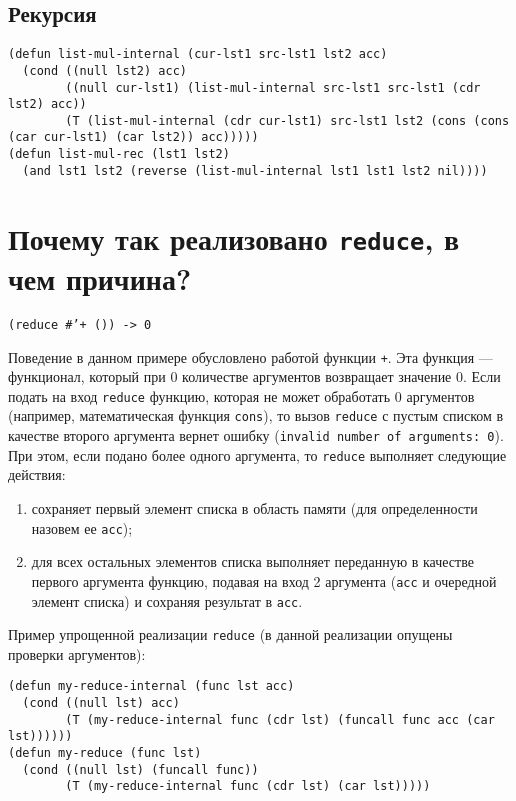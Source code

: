 \subsection{Рекурсия}
\begin{lstlisting}
(defun list-mul-internal (cur-lst1 src-lst1 lst2 acc)
  (cond ((null lst2) acc)
        ((null cur-lst1) (list-mul-internal src-lst1 src-lst1 (cdr lst2) acc))
        (T (list-mul-internal (cdr cur-lst1) src-lst1 lst2 (cons (cons (car cur-lst1) (car lst2)) acc)))))
(defun list-mul-rec (lst1 lst2)
  (and lst1 lst2 (reverse (list-mul-internal lst1 lst1 lst2 nil))))
\end{lstlisting}


\section{Почему так реализовано \texttt{reduce}, в чем причина?}

\texttt{(reduce \#'+ ()) -> 0}

Поведение в данном примере обусловлено работой функции \texttt{+}. Эта функция --- функционал, который при 0 количестве аргументов возвращает значение 0. Если подать на вход \texttt{reduce} функцию, которая не может обработать 0 аргументов (например, математическая функция \texttt{cons}), то вызов \texttt{reduce} с пустым списком в качестве второго аргумента вернет ошибку (\texttt{invalid number of arguments: 0}). При этом, если подано более одного аргумента, то \texttt{reduce} выполняет следующие действия:
\begin{enumerate}
    \item сохраняет первый элемент списка в область памяти (для определенности назовем ее \texttt{acc});
    \item для всех остальных элементов списка выполняет переданную в качестве первого аргумента функцию, подавая на вход 2 аргумента (\texttt{acc} и очередной элемент списка) и сохраняя результат в \texttt{acc}.
\end{enumerate}

Пример упрощенной реализации \texttt{reduce} (в данной реализации опущены проверки аргументов):

\begin{lstlisting}
(defun my-reduce-internal (func lst acc)
  (cond ((null lst) acc)
        (T (my-reduce-internal func (cdr lst) (funcall func acc (car lst))))))
(defun my-reduce (func lst)
  (cond ((null lst) (funcall func))
        (T (my-reduce-internal func (cdr lst) (car lst)))))
\end{lstlisting}

